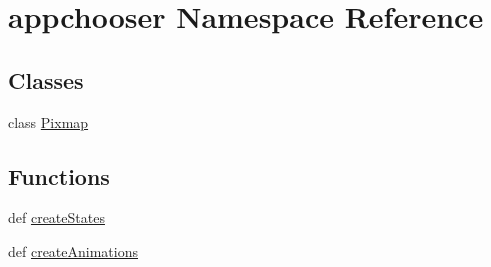 \hypertarget{namespaceappchooser}{}\section{appchooser Namespace Reference}
\label{namespaceappchooser}
\subsection*{Classes}
\begin{DoxyCompactItemize}
\item 
class \hyperlink{classappchooser_1_1Pixmap}{Pixmap}
\end{DoxyCompactItemize}
\subsection*{Functions}
\begin{DoxyCompactItemize}
\item 
def \hyperlink{namespaceappchooser_a7a0239b8ed3e6a265fedb8a7da91bc3d}{create\+States}
\item 
def \hyperlink{namespaceappchooser_ac9f67c88710041a8dfe62ef991e19e4f}{create\+Animations}
\end{DoxyCompactItemize}
